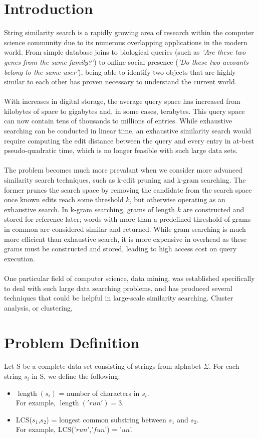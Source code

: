 \documentclass[pdftex,12pt,letter]{article}
\DeclareMathOperator{\length}{length}
\begin{document}
\section{Introduction}
String similarity search is a rapidly growing area of research within the computer science community due to its numerous overlapping applications in the modern world. From simple database joins to biological queries (such as \textit{'Are these two genes from the same family?'}) to online social presence (\textit{'Do these two accounts belong to the same user'}), being able to identify two objects that are highly similar to each other has proven necessary to understand the current world. \\
\\
With increases in digital storage, the average query space has increased from kilobytes of space to gigabytes and, in some cases, terabytes. This query space can now contain tens of thousands to millions of entries. While exhaustive searching can be conducted in linear time, an exhaustive similarity search would require computing the edit distance between the query and every entry in at-best pseudo-quadratic time, which is no longer feasible with such large data sets.\\
\\
The problem becomes much more prevalant when we consider more advanced similarity search techniques, such as k-edit pruning and k-gram searching. The former prunes the search space by removing the candidate from the search space once known edits reach some threshold $k$, but otherwise operating as an exhaustive search. In k-gram searching, grams of length $k$ are constructed and stored for reference later; words with more than a predefined threshold of grams in common are considered similar and returned. While gram searching is much more efficient than exhaustive search, it is more expensive in overhead as these grams must be constructed and stored, leading to high access cost on query execution.\\
\\
One particular field of computer science, data mining, was established specifically to deal with such large data searching problems, and has produced several techniques that could be helpful in large-scale similarity searching. Cluster analysis, or clustering, 

\section{Problem Definition}
Let S be a complete data set consisting of strings from alphabet $\Sigma$. For each string $s_i$ in S, we define the following:
\begin{itemize}
\item $\length(s_i)$ = number of characters in $s_i$.\\ For example, $\length('run') = 3$.
\item LCS($s_1$,$s_2$) = longest common substring between $s_1$ and $s_2$.\\ For example, LCS('$run$','$fun$') = '$un$'.
\end{itemize}
\end{document}
